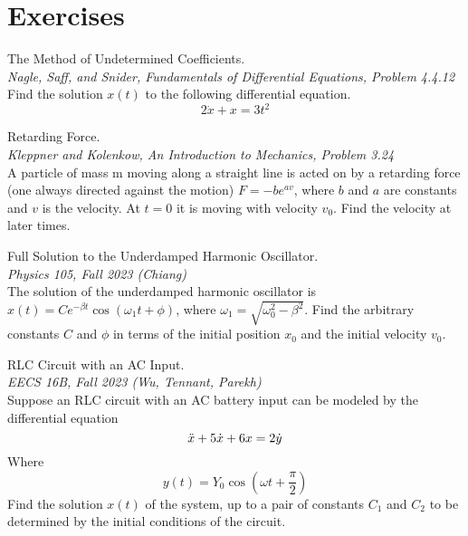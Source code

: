 \documentclass[11pt]{article}
\theoremstyle{gangnamstyle}{\newtheorem{definition}{Definition}[]}
\theoremstyle{gangnamstyle}{\newtheorem{example}{Example}[]}
\theoremstyle{gangnamstyle}{\newtheorem{problem}{Problem}[]}
\theoremstyle{gangnamstyle}{\newtheorem{warning}{Warning}[]}
\begin{document}
\pagebreak

\section{Exercises}

\begin{problem}
The Method of Undetermined Coefficients. \\
\textit{Nagle, Saff, and Snider, Fundamentals of Differential Equations, Problem 4.4.12} \\
Find the solution $x(t)$ to the following differential equation. 
\[ 2\Dot{x} + x = 3t^2 \]
\end{problem}

\begin{problem}
Retarding Force. \\
\textit{Kleppner and Kolenkow, An Introduction to Mechanics, Problem 3.24} \\
A particle of mass m moving along a straight line is acted on by a retarding force (one always directed against the motion) $F = -be^{av}$, where $b$ and $a$ are constants and $v$ is the velocity. At $t = 0$ it is moving with velocity $v_0$. Find the velocity at later times.
\end{problem}

\begin{problem}
Full Solution to the Underdamped Harmonic Oscillator. \\
\textit{Physics 105, Fall 2023 (Chiang)} \\
The solution of the underdamped harmonic oscillator is $x(t) = Ce^{-\beta t}\cos(\omega_1 t + \phi)$, where $\omega_1 = \sqrt{\omega_0^2 - \beta^2}$. Find the arbitrary constants $C$ and $\phi$ in terms of the initial position $x_0$ and the initial velocity $v_0$. 
\end{problem}

\begin{problem}
RLC Circuit with an AC Input. \\
\textit{EECS 16B, Fall 2023 (Wu, Tennant, Parekh)} \\
Suppose an RLC circuit with an AC battery input can be modeled by the differential equation
\[ \Ddot{x} + 5\Dot{x} + 6x = 2\Dot{y} \]
Where
\[ y(t) = Y_0\cos(\omega t + \frac{\pi}{2}) \]
Find the solution $x(t)$ of the system, up to a pair of constants $C_1$ and $C_2$ to be determined by the initial conditions of the circuit. 
\end{problem}
\end{document}
